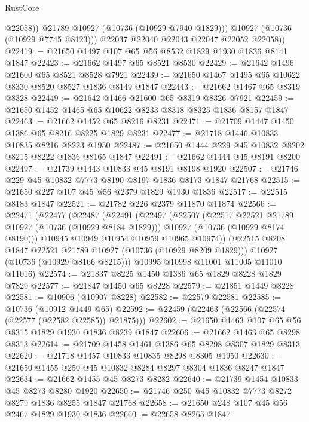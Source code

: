 \begin{lexlean}{RustCore}
\begin{coremodule}
                @22058))
            @21789
            @10927
            (@10736 (@10929 @7940 @1829)))
          @10927
          (@10736 (@10929 @7745 @8123)))
        @22037
        @22040
        @22043
        @22047
        @22052
        @22058))
@22419 := @21650 @1497 @107 @65 @56 @8532 @1829 @1930 @1836 @8141 @1847
@22423 := @21662 @1497 @65 @8521 @8530
@22429 := @21642 @1496 @21600 @65 @8521 @8528 @7921
@22439 := @21650 @1467 @1495 @65 @10622 @8330 @8520 @8527 @1836 @8149 @1847
@22443 := @21662 @1467 @65 @8319 @8328
@22449 := @21642 @1466 @21600 @65 @8319 @8326 @7921
@22459 := @21650 @1452 @1465 @65 @10622 @8233 @8318 @8325 @1836 @8157 @1847
@22463 := @21662 @1452 @65 @8216 @8231
@22471 := @21709 @1447 @1450 @1386 @65 @8216 @8225 @1829 @8231
@22477 := @21718 @1446 @10833 @10835 @8216 @8223 @1950
@22487 := @21650 @1444 @229 @45 @10832 @8202 @8215 @8222 @1836 @8165 @1847
@22491 := @21662 @1444 @45 @8191 @8200
@22497 := @21739 @1443 @10833 @45 @8191 @8198 @1920
@22507 := @21746 @229 @45 @10832 @7773 @8190 @8197 @1836 @8173 @1847 @21768
@22515 := @21650 @227 @107 @45 @56 @2379 @1829 @1930 @1836
@22517 := @22515 @8183 @1847
@22521 := @21782 @226 @2379 @11870 @11874
@22566 := @22471
    (@22477
      (@22487
        (@22491
          (@22497
            (@22507
              (@22517 @22521 @21789 @10927 (@10736 (@10929 @8184 @1829)))
              @10927
              (@10736 (@10929 @8174 @8190)))
            @10945
            @10949
            @10954
            @10959
            @10965
            @10974))
        (@22515 @8208 @1847 @22521 @21789 @10927 (@10736 (@10929 @8209 @1829)))
        @10927
        (@10736 (@10929 @8166 @8215)))
      @10995
      @10998
      @11001
      @11005
      @11010
      @11016)
@22574 := @21837 @8225 @1450 @1386 @65 @1829 @8228 @1829 @7829
@22577 := @21847 @1450 @65 @8228
@22579 := @21851 @1449 @8228
@22581 := @10906 (@10907 @8228)
@22582 := @22579 @22581
@22585 := @10736 (@10912 @1449 @65)
@22592 := @22459 (@22463 (@22566 (@22574 (@22577 (@22582 @22585)) @21875)))
@22602 := @21650 @1463 @107 @65 @56 @8315 @1829 @1930 @1836 @8239 @1847
@22606 := @21662 @1463 @65 @8298 @8313
@22614 := @21709 @1458 @1461 @1386 @65 @8298 @8307 @1829 @8313
@22620 := @21718 @1457 @10833 @10835 @8298 @8305 @1950
@22630 := @21650 @1455 @250 @45 @10832 @8284 @8297 @8304 @1836 @8247 @1847
@22634 := @21662 @1455 @45 @8273 @8282
@22640 := @21739 @1454 @10833 @45 @8273 @8280 @1920
@22650 := @21746 @250 @45 @10832 @7773 @8272 @8279 @1836 @8255 @1847 @21768
@22658 := @21650 @248 @107 @45 @56 @2467 @1829 @1930 @1836
@22660 := @22658 @8265 @1847

\end{coremodule}
\end{lexlean}
